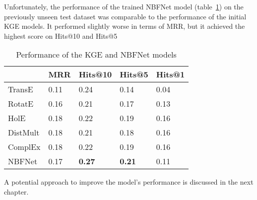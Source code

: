 Unfortunately,
the performance of the trained NBFNet model (table~\ref{tab:nbfnet-res})
on the previously unseen test dataset was comparable to
the performance of the initial KGE models.
It performed slightly worse in terms of MRR, but it achieved the highest score on Hits@10 and Hits@5

\begin{table}[!ht]
    \centering
    \begin{tabular}{|l|l|l|l|l|}
        \hline
        & MRR & Hits@10 & Hits@5 & Hits@1 \\ \hline
        TransE & 0.11   & 0.24 & 0.14 & 0.04 \\ \hline
        RotatE & 0.16   & 0.21 & 0.17 & 0.13 \\ \hline
        HolE & 0.18     &  0.22 & 0.19 & 0.16 \\ \hline
        DistMult & 0.18 & 0.21 & 0.18 & 0.16 \\ \hline
        ComplEx & 0.18  & 0.22 & 0.19 & 0.16 \\ \hline
        NBFNet & 0.17 & \textbf{0.27} & \textbf{0.21} & 0.11 \\ \hline
    \end{tabular}
    \caption{Performance of the KGE and NBFNet models}
    \label{tab:nbfnet-res}
\end{table}

A potential approach to improve the model's performance is discussed in the next chapter.